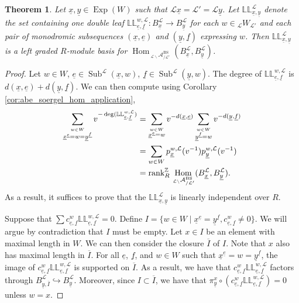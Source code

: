 \documentclass{amsart}
\newcommand{\Z}{\mathbb{Z}}
\newcommand{\scrL}{\mathcal{L}}
\DeclareMathOperator{\Hom}{Hom}
\DeclareMathOperator{\BS}{BS}
\newcommand{\dLL}{\mathbb{L}\mathbb{L}}
\newcommand{\Amon}[2]{\:_{#1 \backslash} \mathcal{A}_{/ #2} }
\DeclareMathOperator{\Exp}{Exp}
\DeclareMathOperator{\Subexp}{Sub}
\newcommand{\W}[2]{{}_{#1}W_{#2}}
\newcommand{\ue}{\underline{e}}
\newcommand{\uf}{\underline{f}}
\newcommand{\ux}{\underline{x}}
\newcommand{\uy}{\underline{y}}
\newcommand{\grk}{\textnormal{rank}^{\Z}}
\newtheorem{theorem}[subsubsection]{Theorem}
\theoremstyle{definition}
\numberwithin{equation}{subsection}
\begin{document}
\begin{theorem}\label{thm:abe_dl_are_basis}
    Let $\ux, \uy \in \Exp (W)$ such that $\scrL \ux = \scrL' = \scrL \uy$.
    Let $\dLL_{\ux, \uy}^{\scrL}$ denote the set containing one double leaf $\dLL_{\ue,\uf}^{w, \scrL} : B_{\ux}^{\scrL} \to B_{\uy}^{\scrL}$ for each $w \in \W{\scrL}{\scrL'}$ and each pair of monodromic subsequences $(\ux, \ue)$ and $(\uy, \uf)$ expressing $w$.
    Then $\dLL_{\ux, \uy}^{\scrL}$ is a left graded $R$-module basis for $\Hom_{\Amon{\scrL}{\scrL'}^{\BS}} (B_{\ux}^{\scrL}, B_{\uy}^{\scrL})$.
\end{theorem}
\begin{proof}
    Let $w \in W$, $\ue \in \Subexp^{\scrL} (\ux, w)$, $\uf \in \Subexp^{\scrL} (\uy, w)$.
    The degree of $\dLL_{\ue,\uf}^{w, \scrL}$ is $d(\ux, \ue) + d(\uy, \uf)$.
    We can then compute using Corollary \ref{cor:abe_soergel_hom_application},
    \begin{align*}
        \sum_{\stackrel{w \in W}{\ux^{\ue} = w = \uy^{\uf}}} v^{-\deg (\dLL_{\ue, \uf}^{w, \scrL})} &=  \sum_{\stackrel{w \in W}{\ux^{\ue} = w}} v^{-d(\ux, \ue)}  \sum_{\stackrel{w \in W}{\uy^{\uf} = w}} v^{-d(\uy, \uf)} \\
        &= \sum_{w \in W} p_{\ux}^{w, \scrL} (v^{-1}) p_{\uy}^{w, \scrL} (v^{-1}) \\
        &= \grk_R \Hom_{\Amon{\scrL}{\scrL'}^{\BS}} (B_{\ux}^{\scrL}, B_{\uy}^{\scrL}).
    \end{align*}
    As a result, it suffices to prove that the $\dLL_{\ux, \uy}^{\scrL}$ is linearly independent over $R$.

    Suppose that $\sum c_{\ue, \uf}^w \dLL_{\ue, \uf}^{w, \scrL} = 0$.
    Define $I = \{ w \in W \mid \ux^{\ue} = \uy^{\uf}, c_{\ue, \uf}^w \neq 0\}$. We will argue by contradiction that $I$ must be empty.
    Let $x \in I$ be an element with maximal length in $W$.
    We can then consider the closure $\overline{I}$ of $I$.
    Note that $x$ also has maximal length in $\overline{I}$. 
    For all $\ue$, $\uf$, and $w \in W$ such that $\ux^{\ue} = w = \uy^{\uf}$, the image of $c_{\ue, \uf}^w \dLL_{\ue,\uf}^{w, \scrL}$ is supported on $\overline{I}$. 
    As a result, we have that $c_{\ue, \uf}^w \dLL_{\ue,\uf}^{w, \scrL}$ factors through $B_{\uy, \overline{I}}^{\scrL} \hookrightarrow B_{\uy}^{\scrL}$.
    Moreover, since $I \subset \overline{I}$, we have that $\pi_{\uy}^x \circ \left( c_{\ue, \uf}^w \dLL_{\ue,\uf}^{w, \scrL} \right) = 0$ unless $w=x$.


\end{proof}
\end{document}
